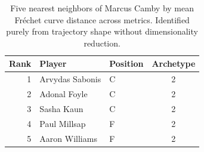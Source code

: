 \begin{table}[htbp]
  \centering\small
  \begin{tabular}{rllc}
    \toprule
    Rank & Player & Position & Archetype \\
    \midrule
    1 & Arvydas Sabonis & C & 2 \\
    2 & Adonal Foyle & C & 2 \\
    3 & Sasha Kaun & C & 2 \\
    4 & Paul Millsap & F & 2 \\
    5 & Aaron Williams & F & 2 \\
    \bottomrule
  \end{tabular}
  \caption{Five nearest neighbors of Marcus Camby by mean Fr\'{e}chet curve distance across metrics. Identified purely from trajectory shape without dimensionality reduction.}
  \label{tab:Marcus_Camby_frechet_curve_neighbors}
\end{table}

